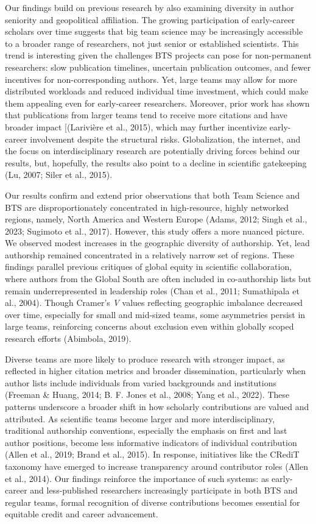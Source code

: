 \documentclass[
  man,floatsintext]{apa7}
\begin{document}
Our findings build on previous research by also examining diversity in
author seniority and geopolitical affiliation. The growing participation
of early-career scholars over time suggests that big team science may be
increasingly accessible to a broader range of researchers, not just
senior or established scientists. This trend is interesting given the
challenges BTS projects can pose for non-permanent researchers: slow
publication timelines, uncertain publication outcomes, and fewer
incentives for non-corresponding authors. Yet, large teams may allow for
more distributed workloads and reduced individual time investment, which
could make them appealing even for early-career researchers. Moreover,
prior work has shown that publications from larger teams tend to receive
more citations and have broader impact {[}(Larivière et al., 2015), which may
further incentivize early-career involvement despite the structural
risks. Globalization, the internet, and the focus on interdisciplinary
research are potentially driving forces behind our results, but,
hopefully, the results also point to a decline in scientific gatekeeping
(Lu, 2007; Siler et al., 2015).

Our results confirm and extend prior observations that both Team Science
and BTS are disproportionately concentrated in high-resource, highly
networked regions, namely, North America and Western Europe (Adams, 2012; Singh et al., 2023; Sugimoto et al., 2017). However, this study offers a more nuanced
picture. We observed modest increases in the geographic diversity of
authorship. Yet, lead authorship remained concentrated in a relatively
narrow set of regions. These findings parallel previous critiques of
global equity in scientific collaboration, where authors from the Global
South are often included in co-authorship lists but remain
underrepresented in leadership roles (Chan et al., 2011; Sumathipala et al., 2004).
Though Cramer's \emph{V} values reflecting geographic imbalance decreased
over time, especially for small and mid-sized teams, some asymmetries
persist in large teams, reinforcing concerns about exclusion even within
globally scoped research efforts (Abimbola, 2019).

Diverse teams are more likely to produce research with stronger impact,
as reflected in higher citation metrics and broader dissemination,
particularly when author lists include individuals from varied
backgrounds and institutions (Freeman \& Huang, 2014; B. F. Jones et al., 2008; Yang et al., 2022).
These patterns underscore a broader shift in how scholarly contributions
are valued and attributed. As scientific teams become larger and more
interdisciplinary, traditional authorship conventions, especially the
emphasis on first and last author positions, become less informative
indicators of individual contribution (Allen et al., 2019; Brand et al., 2015). In
response, initiatives like the CRediT taxonomy have emerged to increase
transparency around contributor roles (Allen et al., 2014). Our findings
reinforce the importance of such systems: as early-career and
less-published researchers increasingly participate in both BTS and
regular teams, formal recognition of diverse contributions becomes
essential for equitable credit and career advancement.
\end{document}
